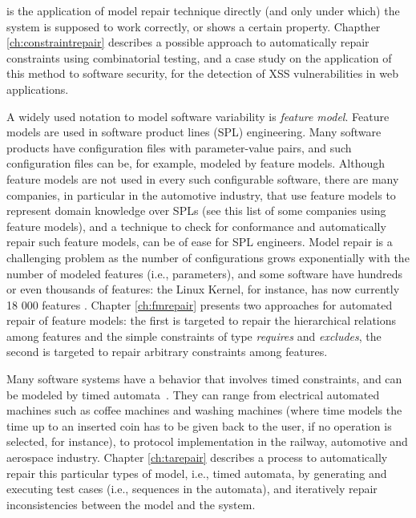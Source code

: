  is the application of model repair technique directly  (and only under which) the system is supposed to work correctly, or shows a certain property. 
Chapther \ref{ch:constraintrepair} describes a possible approach to automatically repair constraints using combinatorial  testing, and a case study on the application of this method to software security, for the detection of XSS vulnerabilities in web applications.

A widely used notation to model software variability is \textit{feature model}. Feature models are used in software product lines (SPL) engineering. Many software products have configuration files with parameter-value pairs, and such configuration files can be, for example, modeled by feature models. Although feature models are not used in every such configurable software, there are many companies, in particular in the automotive industry, that use feature models to represent domain knowledge over SPLs (see this list \cite{deJong2001} of some companies using feature models), and a technique to check for conformance and automatically repair such feature models, can be of ease for SPL engineers. 
Model repair is a challenging problem as the number of configurations grows exponentially with the number of modeled features (i.e., parameters), and some software have hundreds or even thousands of features: the Linux Kernel, for instance, has now currently 18 000 features \cite{thum_towards_2019}.
Chapter \ref{ch:fmrepair} presents two approaches for automated repair of feature models: the first is targeted to repair the hierarchical relations among features and the simple constraints of type \textit{requires} and \textit{excludes}, the second is targeted to repair arbitrary constraints among features.

Many software systems have a behavior that involves timed constraints, and can be modeled by timed automata~\cite{ACEF09,AD94,AFKS12}. They can range from electrical automated machines such as coffee machines and washing machines (where time models the time up to an inserted coin has to be given back to the user, if no operation is selected, for instance), to protocol implementation in the railway, automotive and aerospace industry.
Chapter \ref{ch:tarepair} describes a process to automatically repair this particular types of model, i.e., timed automata, by generating and executing test cases (i.e., sequences in the automata), and iteratively repair inconsistencies between the model and the system.

